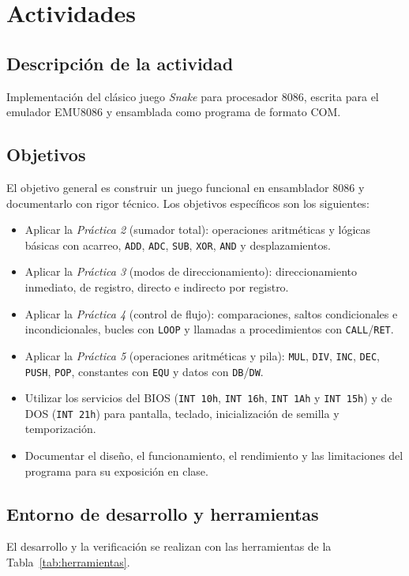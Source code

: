 \documentclass[10pt]{article}
\begin{document}
\newpage
\tableofcontents
\thispagestyle{plain}
\clearpage

\section{Actividades}

\subsection{Descripción de la actividad}
Implementación del clásico juego \textit{Snake} para procesador 8086, escrita para el emulador EMU8086 y ensamblada como programa de formato COM.

\subsection{Objetivos}
El objetivo general es construir un juego funcional en ensamblador 8086 y documentarlo con rigor técnico. Los objetivos específicos son los siguientes:
\begin{itemize}[leftmargin=*]
  \item Aplicar la \textit{Práctica 2} (sumador total): operaciones aritméticas y lógicas básicas con acarreo, \texttt{ADD}, \texttt{ADC}, \texttt{SUB}, \texttt{XOR}, \texttt{AND} y desplazamientos.
  \item Aplicar la \textit{Práctica 3} (modos de direccionamiento): direccionamiento inmediato, de registro, directo e indirecto por registro.
  \item Aplicar la \textit{Práctica 4} (control de flujo): comparaciones, saltos condicionales e incondicionales, bucles con \texttt{LOOP} y llamadas a procedimientos con \texttt{CALL}/\texttt{RET}.
  \item Aplicar la \textit{Práctica 5} (operaciones aritméticas y pila): \texttt{MUL}, \texttt{DIV}, \texttt{INC}, \texttt{DEC}, \texttt{PUSH}, \texttt{POP}, constantes con \texttt{EQU} y datos con \texttt{DB}/\texttt{DW}.
    \item Utilizar los servicios del BIOS (\texttt{INT 10h}, \texttt{INT 16h}, \texttt{INT 1Ah} y \texttt{INT 15h}) y de DOS (\texttt{INT 21h}) para pantalla, teclado, inicialización de semilla y temporización.
  \item Documentar el diseño, el funcionamiento, el rendimiento y las limitaciones del programa para su exposición en clase.
\end{itemize}

\subsection{Entorno de desarrollo y herramientas}
El desarrollo y la verificación se realizan con las herramientas de la Tabla~\ref{tab:herramientas}.
\end{document}

